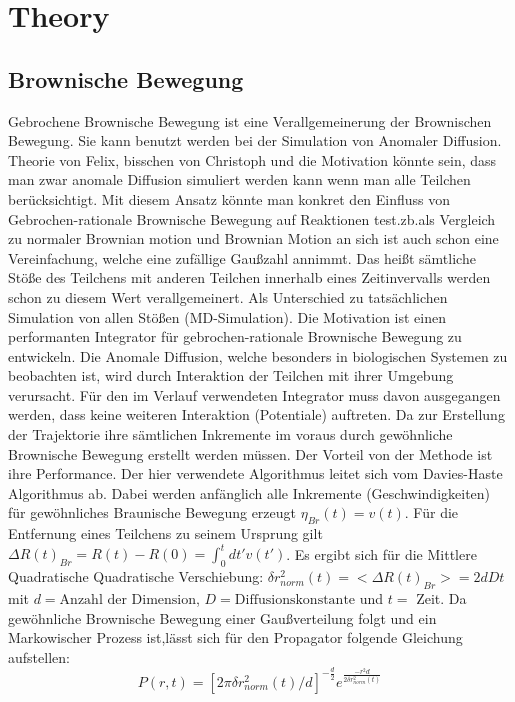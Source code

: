 \documentclass[
  a4paper,BCOR10mm,oneside,
  bibtotoc,idxtotoc,
  headsepline,footsepline,%
  fleqn,openbib
]{scrbook}
\begin{document}
\printnomenclature
\clearpage
\chapter{Theory}
\section{Brownische Bewegung}
Gebrochene Brownische Bewegung ist eine Verallgemeinerung der Brownischen Bewegung. Sie kann benutzt werden bei der Simulation von Anomaler Diffusion.\newline \newline
Theorie von Felix, bisschen von Christoph und die Motivation könnte sein, dass man zwar anomale Diffusion simuliert werden kann wenn man alle Teilchen berücksichtigt. Mit diesem Ansatz könnte man konkret den Einfluss von Gebrochen-rationale Brownische Bewegung auf Reaktionen test.zb.als Vergleich zu normaler Brownian motion und Brownian Motion an sich ist auch schon eine Vereinfachung, welche eine zufällige Gaußzahl annimmt. Das heißt sämtliche Stöße des Teilchens mit anderen Teilchen innerhalb eines Zeitinvervalls werden schon zu diesem Wert verallgemeinert. Als Unterschied zu tatsächlichen Simulation von allen Stößen (MD-Simulation).
Die Motivation ist einen performanten Integrator für gebrochen-rationale Brownische Bewegung zu entwickeln. Die Anomale Diffusion, welche besonders in biologischen Systemen zu beobachten ist, wird durch Interaktion der Teilchen mit ihrer Umgebung verursacht. Für den im Verlauf verwendeten Integrator muss davon ausgegangen werden, dass keine weiteren Interaktion (Potentiale) auftreten. Da zur Erstellung der Trajektorie ihre sämtlichen Inkremente im voraus durch gewöhnliche Brownische Bewegung erstellt werden müssen. Der Vorteil von der Methode ist ihre Performance.  
Der hier verwendete Algorithmus leitet sich vom Davies-Haste Algorithmus \cite{Craigmile2003} ab.
Dabei werden anfänglich alle Inkremente (Geschwindigkeiten) für gewöhnliches Braunische Bewegung erzeugt $\eta_{Br}(t)= v(t)$. Für die Entfernung eines Teilchens zu seinem Ursprung gilt  $\Delta R(t)_{Br} = R(t)- R(0)= \int^t_{0}dt' v(t')$. Es ergibt sich für die Mittlere Quadratische Quadratische Verschiebung: \newline $\delta r^{2}_{norm}(t)= < \Delta R(t)_{Br}>=2dDt$ mit $d =\text{Anzahl der Dimension}$, $D = \text{Diffusionskonstante}$ und $t=$ Zeit. Da gewöhnliche Brownische Bewegung einer Gaußverteilung folgt und ein Markowischer Prozess ist,lässt sich für den Propagator  folgende Gleichung aufstellen:
\begin{equation}
 P(r,t)=[2 \pi \delta r^{2}_{norm}(t)/d]^{-\frac{d}{2}} e^{ \frac{-r^2 d}{2 \delta r^{2}_{norm}(t) }}
\end{equation}
\end{document}
